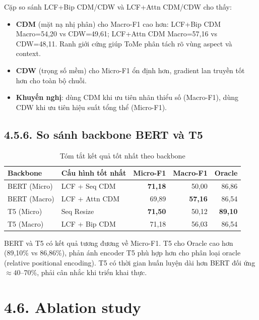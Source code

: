 Cặp so sánh LCF+Bip CDM/CDW và LCF+Attn CDM/CDW cho thấy:
\begin{itemize}
  \item \textbf{CDM} (mặt nạ nhị phân) cho Macro-F1 cao hơn: LCF+Bip CDM
        Macro=54,20 vs CDW=49,61; LCF+Attn CDM Macro=57,16 vs CDW=48,11.
        Ranh giới cứng giúp ToMe phân tách rõ vùng aspect và context.
  \item \textbf{CDW} (trọng số mềm) cho Micro-F1 ổn định hơn, gradient
        lan truyền tốt hơn cho toàn bộ chuỗi.
  \item \textbf{Khuyến nghị}: dùng CDM khi ưu tiên nhãn thiểu số
        (Macro-F1), dùng CDW khi ưu tiên hiệu suất tổng thể (Micro-F1).
\end{itemize}

\subsection{4.5.6.\; So sánh backbone BERT và T5}

\begin{table}[H]
\centering
\small
\caption{Tóm tắt kết quả tốt nhất theo backbone}
\label{tab:backbone_summary}
\begin{tabular}{@{}llrrr@{}}
\toprule
\textbf{Backbone} & \textbf{Cấu hình tốt nhất} & \textbf{Micro-F1} & \textbf{Macro-F1} & \textbf{Oracle} \\
\midrule
BERT (Micro) & LCF + Seq CDM & \textbf{71,18} & 50,00 & 86,86 \\
BERT (Macro) & LCF + Attn CDM & 69,89 & \textbf{57,16} & 86,54 \\
T5 (Micro)   & Seq Resize     & \textbf{71,50} & 50,12 & \textbf{89,10} \\
T5 (Macro)   & LCF + Bip CDM  & 71,18 & 56,03 & 86,54 \\
\bottomrule
\end{tabular}
\end{table}

BERT và T5 có kết quả tương đương về Micro-F1. T5 cho Oracle cao hơn
(89,10\% vs 86,86\%), phản ánh encoder T5 phù hợp hơn cho phân loại
oracle (relative positional encoding). T5 có thời gian huấn luyện dài
hơn BERT đối ứng $\approx40$--70\%, phải cân nhắc khi triển khai thực.

\section{4.6.\; Ablation study}
\label{sec:ablation}

